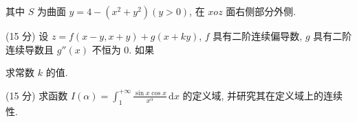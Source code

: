 其中 $S$ 为曲面 $y = 4 - (x^{2} + y^{2})(y > 0)$, 在 $xoz$ 面右侧部分外侧.\par
\par{}
(15 分) 设 $z = f(x - y, x + y) + g(x + ky)$, $f$ 具有二阶连续偏导数, $g$ 具有二阶连续导数且 $g''(x)$ 不恒为 0. 如果\par
\nopagebreak[4]
求常数 $k$ 的值.\par
(15 分) 求函数 $I(\alpha) = \int_{1}^{+\infty} \frac{\sin x \cos x}{x^{\alpha}} \, \mathrm{d}x$ 的定义域, 并研究其在定义域上的连续性.\par
